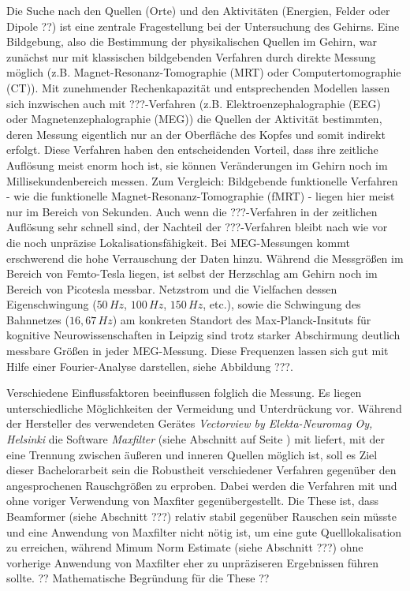 \documentclass[doc,a4paper,12pt]{apa6}
\makeatletter
\DeclareRobustCommand*{\nameref}[1]{%
      \glqq{\myorg@nameref{#1}}\grqq%
    }%
\makeatother
\begin{document}
Die Suche nach den Quellen (Orte) und den Aktivitäten (Energien, Felder oder Dipole ??) ist eine zentrale Fragestellung bei der Untersuchung des Gehirns. Eine Bildgebung, also die Bestimmung der physikalischen Quellen im Gehirn, war zunächst nur mit klassischen bildgebenden Verfahren durch direkte Messung möglich (z.B. Magnet-Resonanz-Tomographie (MRT) oder Computertomographie (CT)). Mit zunehmender Rechenkapazität und entsprechenden Modellen lassen sich inzwischen auch mit ???-Verfahren (z.B. Elektroenzephalographie (EEG) oder Magnetenzephalographie (MEG)) die Quellen der Aktivität bestimmten, deren Messung eigentlich nur an der Oberfläche des Kopfes und somit indirekt erfolgt. Diese Verfahren haben den entscheidenden Vorteil, dass ihre zeitliche Auflösung meist enorm hoch ist, sie können Veränderungen im Gehirn noch im Millisekundenbereich messen. Zum Vergleich: Bildgebende funktionelle Verfahren - wie die funktionelle Magnet-Resonanz-Tomographie (fMRT) - liegen hier meist nur im Bereich von Sekunden. Auch wenn die ???-Verfahren in der zeitlichen Auflösung sehr schnell sind, der Nachteil der ???-Verfahren bleibt nach wie vor die noch unpräzise Lokalisationsfähigkeit. Bei MEG-Messungen kommt erschwerend die hohe Verrauschung der Daten hinzu. Während die Messgrößen im Bereich von Femto-Tesla liegen, ist selbst der Herzschlag am Gehirn noch im Bereich von Picotesla messbar. Netzstrom und die Vielfachen dessen Eigenschwingung ($50\,Hz$, $100\,Hz$, $150\,Hz$, etc.), sowie die Schwingung des Bahnnetzes ($16,67\,Hz$) am konkreten Standort des Max-Planck-Insituts für kognitive Neurowissenschaften in Leipzig sind trotz starker Abschirmung deutlich messbare Größen in jeder MEG-Messung. Diese Frequenzen lassen sich gut mit Hilfe einer Fourier-Analyse darstellen, siehe Abbildung ???.

Verschiedene Einflussfaktoren beeinflussen folglich die Messung. Es liegen unterschiedliche Möglichkeiten der Vermeidung und Unterdrückung vor. Während der Hersteller des verwendeten Gerätes \emph{Vectorview by Elekta-Neuromag Oy, Helsinki} die Software \emph{Maxfilter} (siehe Abschnitt \nameref{sec:maxfilter} auf Seite \pageref{sec:maxfilter}) mit liefert, mit der eine Trennung zwischen äußeren und inneren Quellen möglich ist, soll es Ziel dieser Bachelorarbeit sein die Robustheit verschiedener Verfahren gegenüber den angesprochenen Rauschgrößen zu erproben. Dabei werden die Verfahren mit und ohne voriger Verwendung von Maxfiter gegenübergestellt. Die These ist, dass Beamformer (siehe Abschnitt ???) relativ stabil gegenüber Rauschen sein müsste und eine Anwendung von Maxfilter nicht nötig ist, um eine gute Quelllokalisation zu erreichen, während Mimum Norm Estimate (siehe Abschnitt ???) ohne vorherige Anwendung von Maxfilter eher zu unpräziseren Ergebnissen führen sollte. ?? Mathematische Begründung für die These ??
\end{document}
